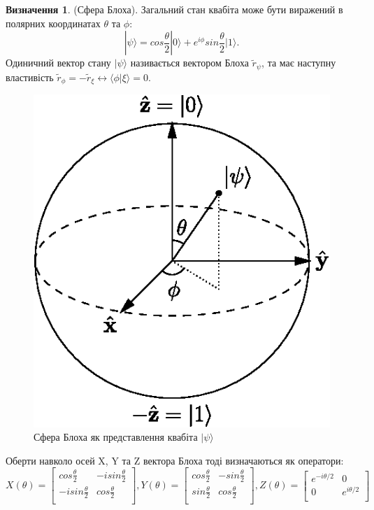 \documentclass{article}
\theoremstyle{definition}
\newtheorem{definition}{Визначення}
\begin{document}
\begin{definition} (Сфера Блоха).
Загальний стан квабіта може бути виражений в полярних координатах $\theta$ та $\phi$:
$$
|\psi\rangle=cos\frac{\theta}{2}|0\rangle+e^{i\phi}sin\frac{\theta}{2}|1\rangle.
$$
Одиничний вектор стану $|\psi\rangle$ називається вектором Блоха $\tilde{r}_\psi$, та має
наступну властивість $\tilde{r}_\phi=-\tilde{r}_\xi \leftrightarrow \langle\phi|\xi\rangle = 0$.
\begin{figure}[h]
  \centerline{\includegraphics[scale=0.6]{bloch.eps}}
  \caption{Сфера Блоха як представлення квабіта $|\psi\rangle$}
\end{figure}
Оберти навколо осей X, Y та Z вектора Блоха тоді визначаються як оператори:
$$
X(\theta) = \begin{bmatrix}
cos\frac{\theta}{2} & -i sin\frac{\theta}{2} \\
-i sin\frac{\theta}{2} & cos\frac{\theta}{2} \\
\end{bmatrix},
Y(\theta) = \begin{bmatrix}
cos\frac{\theta}{2} & -sin\frac{\theta}{2} \\
sin\frac{\theta}{2} & cos\frac{\theta}{2} \\
\end{bmatrix},
Z(\theta) = \begin{bmatrix}
e^{-i\theta/2} & 0 \\
0 & e^{i\theta/2} \\
\end{bmatrix}
$$
\end{definition}
\end{document}
